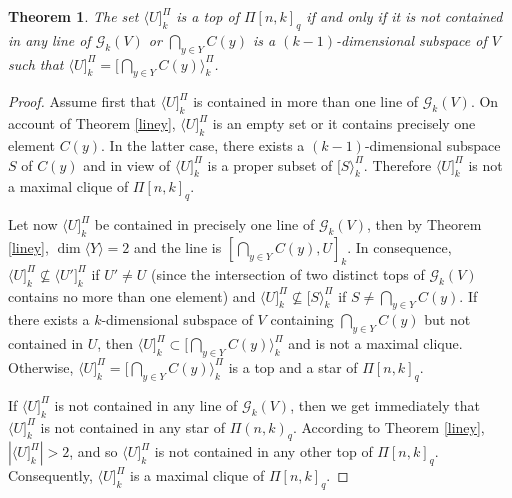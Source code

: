 \documentclass[12pt]{article}
\newtheorem{theorem}{Theorem}
\theoremstyle{definition}
\begin{document}
  \begin{theorem}\label{projective top}
  The set $\langle U]^{\Pi}_{k}$ is a top of $\Pi[n,k]_{q}$ if and only if it
  is not contained in any line of  ${\mathcal G}_{k}(V)$ or $\bigcap_{y\in Y}C(y)$ is a $(k-1)$-dimensional subspace of $V$ such that $\langle U]^{\Pi}_{k}=[\bigcap_{y\in Y}C(y)\rangle^{\Pi}_{k}$.
\end{theorem}
\begin{proof}
Assume first that $\langle U]^{\Pi}_{k}$
  is contained in more than one line of  ${\mathcal G}_{k}(V)$.  On account of Theorem \ref{liney},  $\langle U]^{\Pi}_{k}$ is an empty set or it contains precisely one element $C(y)$. In the latter case,  there exists a $(k-1)$-dimensional subspace $S$ of $C(y)$ and in view of \cite[Proposition 1]{B} $\langle U]^{\Pi}_{k}$ is a proper subset of $[S\rangle^{\Pi}_{k}$. Therefore $\langle U]^{\Pi}_{k}$ is not a maximal clique of $\Pi[n,k]_{q}$.

  Let now $\langle U]^{\Pi}_{k}$
  be contained in  precisely one line of ${\mathcal G}_{k}(V)$, then by Theorem \ref{liney}, $\dim \langle Y\rangle=2$ and the line is $[\bigcap_{y\in Y}C(y), U]_k$.  In consequence, $\langle U]^{\Pi}_{k}\nsubseteq\langle U']^{\Pi}_{k}$ if $U'\neq U$ (since the intersection of two distinct tops of ${\mathcal G}_{k}(V)$ contains no more than one element) and $\langle U]^{\Pi}_{k}\nsubseteq[S\rangle^{\Pi}_{k}$ if $S\neq \bigcap_{y\in Y}C(y)$. If there exists a $k$-dimensional subspace of $V$ containing $\bigcap_{y\in Y}C(y)$ but not contained in $U$, then  $\langle U]^{\Pi}_{k}\subset[\bigcap_{y\in Y}C(y)\rangle^{\Pi}_{k}$ and is not a maximal clique. Otherwise, $\langle U]^{\Pi}_{k}=[\bigcap_{y\in Y}C(y)\rangle^{\Pi}_{k}$ is a top and a star of $\Pi[n,k]_{q}$.

 If $\langle U]^{\Pi}_{k}$ is not contained in any line of  ${\mathcal G}_{k}(V)$, then we get immediately that $\langle U]^{\Pi}_{k}$ is not contained in any star of $\Pi(n,k)_{q}$. According to Theorem \ref{liney}, $|\langle U]^{\Pi}_{k}|>2$, and so $\langle U]^{\Pi}_{k}$ is not contained in any other top of $\Pi[n,k]_{q}$. Consequently,
$\langle U]^{\Pi}_{k}$ is a maximal clique of $\Pi[n,k]_{q}$.




\end{proof}
\end{document}
